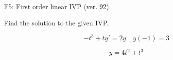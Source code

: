 \begin{exercise}
  \begin{exerciseTitle}F5: First order linear IVP (ver. 92)\end{exerciseTitle}
  \begin{exerciseStatement}
    
Find the solution to the given IVP.

    
\[-t^{3} +ty'= 2 y \hspace{1em} y( -1 ) = 3\]

  \end{exerciseStatement}
  \begin{exerciseAnswer}
    
\[y= 4 t^ 2 + t^{3}\]

  \end{exerciseAnswer}
\end{exercise}